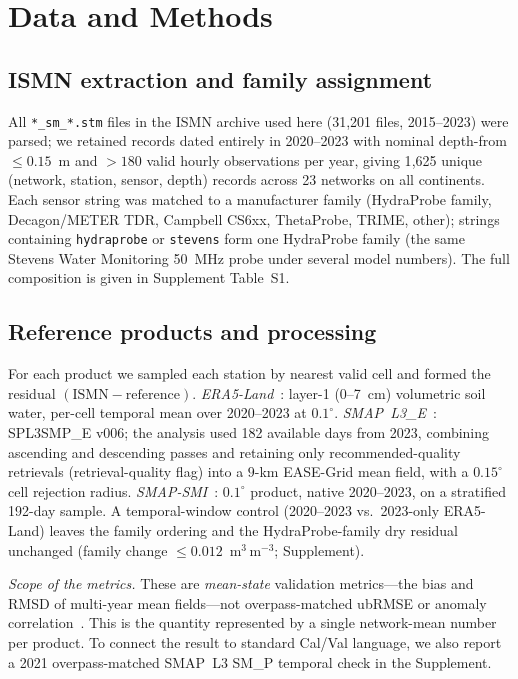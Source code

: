 \documentclass[journal]{IEEEtran}
\begin{document}
\section{Data and Methods}

\subsection{ISMN extraction and family assignment}
All \texttt{*\_sm\_*.stm} files in the ISMN archive used here
(31{,}201 files, 2015–2023) were parsed; we retained records dated
entirely in 2020–2023 with nominal depth-from $\le 0.15$~m and
$>180$ valid hourly observations per year, giving 1{,}625 unique
(network, station, sensor, depth) records across 23 networks on all
continents. Each sensor string was matched to a manufacturer family
(HydraProbe family, Decagon/METER TDR, Campbell CS6xx, ThetaProbe,
TRIME, other); strings containing \texttt{hydraprobe} or
\texttt{stevens} form one HydraProbe family (the same Stevens Water
Monitoring 50~MHz probe under several model numbers). The full
composition is given in Supplement Table~S1.

\subsection{Reference products and processing}
For each product we sampled each station by nearest valid cell and
formed the residual $(\mathrm{ISMN}-\mathrm{reference})$.
\emph{ERA5-Land}~\cite{MunozSabater2021}: layer-1 (0–7~cm) volumetric
soil water, per-cell temporal mean over 2020–2023 at $0.1^\circ$.
\emph{SMAP~L3\_E}~\cite{ONeill2021}: SPL3SMP\_E v006; the analysis used
182 available days from 2023, combining ascending and descending passes
and retaining only recommended-quality retrievals (retrieval-quality
flag) into a $9$-km EASE-Grid mean field, with a $0.15^\circ$ cell
rejection radius. \emph{SMAP-SMI}~\cite{Zeng2025SMI}: $0.1^\circ$
product, native 2020–2023, on a stratified 192-day sample. A
temporal-window control (2020–2023 vs.\ 2023-only ERA5-Land) leaves
the family ordering and the HydraProbe-family dry residual unchanged
(family change $\le\!0.012$~m$^3$\,m$^{-3}$; Supplement).

\emph{Scope of the metrics.} These are \emph{mean-state} validation
metrics—the bias and RMSD of multi-year mean fields—not
overpass-matched ubRMSE or anomaly correlation~\cite{Entekhabi2010,DraperDAS2012}.
This is the quantity represented by a single network-mean number per
product. To connect the result to standard Cal/Val language, we also
report a 2021 overpass-matched SMAP~L3 SM\_P temporal check in the
Supplement.
\end{document}
